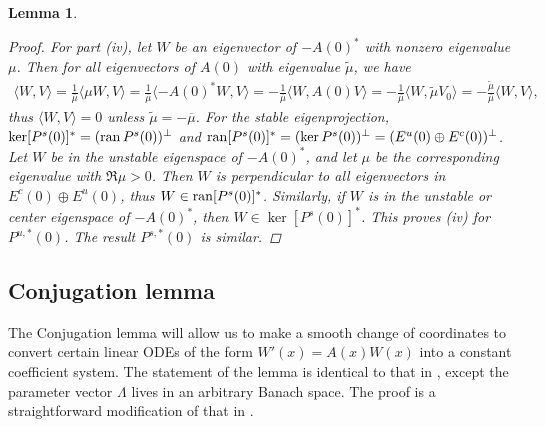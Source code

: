 \documentclass[10pt,reqno]{amsart}
\theoremstyle{plain}
\newtheorem{lemma}[theorem]{Lemma}
\theoremstyle{definition}
\theoremstyle{remark}
\numberwithin{theorem}{section}
\numberwithin{equation}{section}
\begin{document}
\begin{lemma}
\begin{proof}
For part (iv), let $W$ be an eigenvector of $-A(0)^*$ with nonzero eigenvalue $\mu$. Then for all eigenvectors of $A(0)$ with eigenvalue $\tilde{\mu}$, we have 
\begin{align*}
\langle W, V \rangle = \frac{1}{\overline{\mu}} \langle \mu W, V \rangle
= \frac{1}{\overline{\mu}}\langle -A(0)^* W, V \rangle = -\frac{1}{\overline{\mu}}\langle W, A(0) V \rangle = -\frac{1}{\overline{\mu}}\langle W, \tilde{\mu} V_0 \rangle = -\frac{\tilde{\mu}}{\overline{\mu}}\langle W, V \rangle,
\end{align*}
thus $\langle W, V \rangle = 0$ unless $\tilde{\mu} = -\overline{\mu}$. For the stable eigenprojection, $\mathop\mathrm{ker}\nolimits [P^s(0)]^* = (\operatorname{ran} P^s(0))^\perp$ and $\operatorname{ran} [P^s(0)]^* = (\mathop\mathrm{ker}\nolimits P^s(0))^\perp = (E^u(0) \oplus E^c(0))^\perp$. Let $W$ be in the unstable eigenspace of $-A(0)^*$, and let $\mu$ be the corresponding eigenvalue with $\Re \mu > 0$. Then $W$ is perpendicular to all eigenvectors in $E^c(0) \oplus E^u(0)$, thus $W \in \operatorname{ran} [P^s(0)]^*$. Similarly, if $W$ is in the unstable or center eigenspace of $-A(0)^*$, then $W \in \ker [P^s(0)]^*$. This proves (iv) for $P^{u,*}(0)$. The result $P^{s,*}(0)$ is similar.
\end{proof}
\end{lemma}

\subsection{Conjugation lemma}

The Conjugation lemma will allow us to make a smooth change of coordinates to convert certain linear ODEs of the form $W'(x) = A(x) W(x)$ into a constant coefficient system. The statement of the lemma is identical to that in \cite{Zumbrun2009}, except the parameter vector $\Lambda$ lives in an arbitrary Banach space. The proof is a straightforward modification of that in \cite{Zumbrun2009}.
\end{document}
